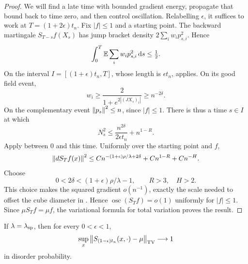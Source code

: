 \begin{proof}
We will find a late time with bounded gradient energy, propagate that
bound back to time zero, and then control oscillation.  Relabelling
$\epsilon$, it suffices to work at $T=(1+2\epsilon)t_n$.  Fix
$|f|\le1$ and a starting point.  The backward martingale
$S_{T-s}f(X_s)$ has jump bracket density
$2\sum_iw_i p_{s,i}^2$.  Hence
\begin{equation}
 \int_0^T\mathbb E\sum_iw_i p_{s,i}^2\,\mathrm d s\le\tfrac12.
 \label{eq:cutoff-energy-budget}
\end{equation}
On the interval $I=[(1+\epsilon)t_n,T]$, whose length is
$\epsilon t_n$,  applies.  On its good
field event,
\[
 w_i\ge\frac{2}{1+e^{2|(JX_s)_i|}}\ge n^{-2\delta}.
\]
On the complementary event $\left\lVert p_s\right\rVert^2\le n$, since $|f|\le1$.
There is thus a time $s\in I$ at which
\begin{equation}
 N_s^2\le\frac{n^{2\delta}}{2\epsilon t_n}+n^{1-R}.
 \label{eq:cutoff-terminal-energy}
\end{equation}
Apply  between $0$ and this time.  Uniformly
over the starting point and $f$,
\[
 \left\lVert dS_Tf(x)\right\rVert^2
 \le C n^{-(1+\epsilon)\rho/\lambda+2\delta}
       +C n^{1-R}+C n^{-H}.
\]
Choose
\[
 0<2\delta<(1+\epsilon)\rho/\lambda-1,
 \qquad R>3,\quad H>2.
\]
This choice makes the squared gradient $o(n^{-1})$, exactly the scale
needed to offset the cube diameter in .
Hence $\operatorname{osc}(S_Tf)=o(1)$ uniformly for $|f|\le1$.  Since $\mu S_Tf=\mu f$, the variational
formula for total variation proves the result.
\end{proof}

\begin{lemma}
\label{lem:cutoff-spin-lower}
If $\lambda=\lambda_{\rm sp}$, then for every $0<\epsilon<1$,
\[
 \sup_x\left\lVert S_{(1-\epsilon)t_n}(x,\cdot)-\mu\right\rVert_{\operatorname{TV}}
 \longrightarrow1
\]
in disorder probability.
\end{lemma}

